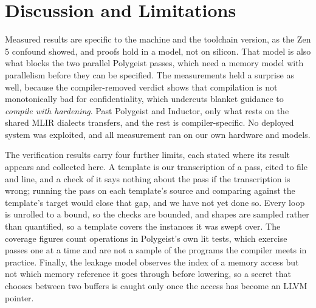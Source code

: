 \section{Discussion and Limitations}
\label{sec:discussion}

 Measured results are specific to the machine and the toolchain version, as the Zen 5 confound showed, and proofs hold in a model, not on silicon. That model is also what blocks the two parallel Polygeist passes, which need a memory model with parallelism before they can be specified. The measurements held a surprise as well, because the compiler-removed verdict shows that compilation is not monotonically bad for confidentiality, which undercuts blanket guidance to \emph{compile with hardening}. Past Polygeist and Inductor, only what rests on the shared MLIR dialects transfers, and the rest is compiler-specific. No deployed system was exploited, and all measurement ran on our own hardware and models.

The verification results carry four further limits, each stated where its result appears and collected here.
A template is our transcription of a pass, cited to file and line, and a check of it says nothing about the pass if the transcription is wrong; running the pass on each template's source and comparing against the template's target would close that gap, and we have not yet done so.
Every loop is unrolled to a bound, so the checks are bounded, and shapes are sampled rather than quantified, so a template covers the instances it was swept over.
The coverage figures count operations in Polygeist's own lit tests, which exercise passes one at a time and are not a sample of the programs the compiler meets in practice.
Finally, the leakage model observes the index of a memory access but not which memory reference it goes through before lowering, so a secret that chooses between two buffers is caught only once the access has become an LLVM pointer.
